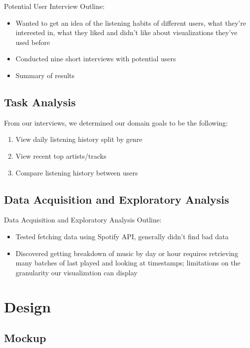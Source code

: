 \documentclass[journal]{vgtc}                %
\begin{document}
Potential User Interview Outline:
\begin{itemize}
  \item Wanted to get an idea of the listening habits of different users, what they're interested in, what they liked and didn't like about visualizations they've used before
  \item Conducted nine short interviews with potential users
  \item Summary of results
\end{itemize}

\subsection{Task Analysis}

From our interviews, we determined our domain goals to be the following:
\begin{enumerate}
  \item View daily listening history split by genre
  \item View recent top artists/tracks
  \item Compare listening history between users
\end{enumerate}


\subsection{Data Acquisition and Exploratory Analysis}
Data Acquisition and Exploratory Analysis Outline:
\begin{itemize}
  \item Tested fetching data using Spotify API, generally didn't find bad data
  \item Discovered getting breakdown of music by day or hour requires retrieving many batches of last played and looking at timestamps; limitations on the granularity our visualization can display
\end{itemize}

\section{Design}

\subsection{Mockup}

\end{document}
